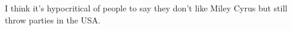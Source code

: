 \item I think it's hypocritical of people to say they don't like Miley
  Cyrus but still throw parties in the USA.
